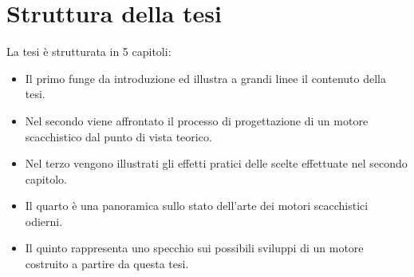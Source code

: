 \section{Struttura della tesi}
La tesi è strutturata in 5 capitoli:
\begin{itemize}
\item Il primo funge da introduzione ed illustra a grandi linee il contenuto della tesi. 
\item Nel secondo viene affrontato il processo di progettazione di un motore scacchistico dal punto di vista teorico.
\item Nel terzo vengono illustrati gli effetti pratici delle scelte effettuate nel secondo capitolo.
\item Il quarto è una panoramica sullo stato dell'arte dei motori scacchistici odierni.
\item Il quinto rappresenta uno specchio sui possibili sviluppi di un motore costruito a partire da questa tesi.
\end{itemize}
